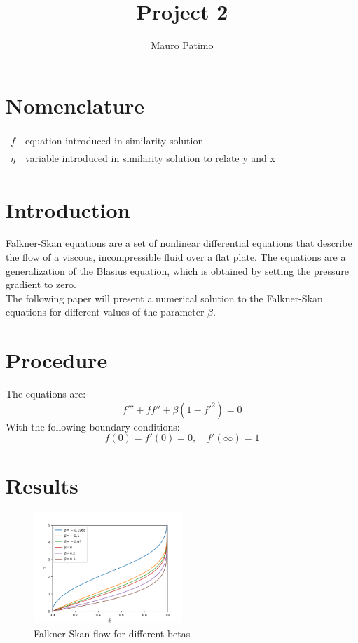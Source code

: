 \documentclass[conf]{new-aiaa}
\title{Project 2}
\author{Mauro Patimo}
\begin{document}
\maketitle

\section{Nomenclature}

{\renewcommand\arraystretch{1.0}
\noindent\begin{longtable*}{@{}l @{\quad=\quad} l@{}}
$f$  & equation introduced in similarity solution \\
$\eta$ & variable introduced in similarity solution to relate y and x\\

\end{longtable*}}

\section{Introduction}
Falkner-Skan equations are a set of nonlinear differential equations that describe the flow of a viscous, incompressible fluid over a flat plate. The equations are a generalization of the Blasius equation, which is obtained by setting the pressure gradient to zero. \\
The following paper will present a numerical solution to the Falkner-Skan equations for different values of the parameter $\beta$. \\
\section{Procedure}
The equations are:
\begin{equation}
    f'''+ff''+\beta(1-f'^2)=0
\end{equation}
With the following boundary conditions:
\begin{equation}
    f(0)=f'(0)=0, \quad f'(\infty)=1
\end{equation}

\section{Results}
\begin{figure}[H]
    \centering
    \includegraphics[width=0.5\textwidth]{Project 2.png}
    \caption{Falkner-Skan flow for different betas}
    \label{fig:Falkner-Skan for different betas}
\end{figure}
\end{document}
